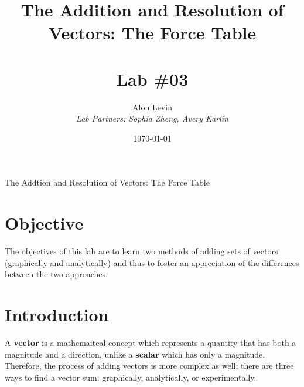 \documentclass[11pt, titlepage]{article}
\title{\Huge{The Addition and Resolution of Vectors: The Force Table} \\ \ \\ \huge Lab \#03}
\author{\Large{Alon Levin} \\ \emph{Lab Partners: Sophia Zheng, Avery Karlin}}
\date{\today}
\begin{document}
\maketitle

\begin{center}
\LARGE The Addtion and Resolution of Vectors: The Force Table
\end{center}

\section*{Objective}
The objectives of this lab are to learn two methods of adding sets of vectors (graphically and analytically) and thus to foster an appreciation of the differences between the two approaches.

\section*{Introduction}
A \textbf{vector} is a mathemaitcal concept which represents a quantity that has both a magnitude and a direction, unlike a \textbf{scalar} which has only a magnitude. Therefore, the process of adding vectors is more complex as well; there are three ways to find a vector sum: graphically, analytically, or experimentally.
\end{document}
